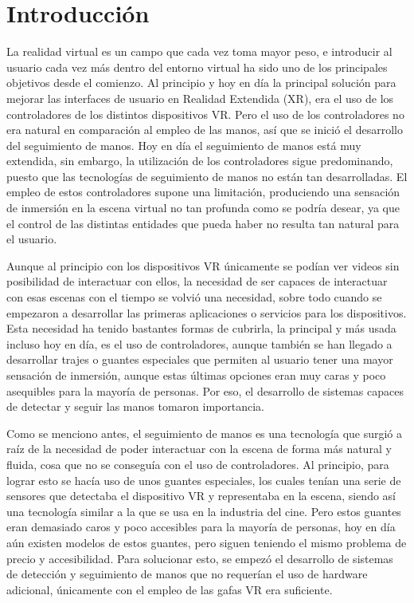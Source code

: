 \documentclass[a4paper, 12pt]{book}
\begin{document}
\chapter{Introducción}
\label{sec:intro} %
La realidad virtual es un campo que cada vez toma mayor peso, e introducir al usuario cada vez más dentro del entorno virtual ha sido uno de los principales objetivos desde el comienzo. Al principio y hoy en día la principal 
solución para mejorar las interfaces de usuario en Realidad Extendida (XR), era el uso de los controladores de los distintos dispositivos VR. Pero el uso de los controladores no era natural en comparación al empleo de las manos, así que se inició el desarrollo del seguimiento de manos. Hoy en 
día el seguimiento de manos está muy extendida, sin embargo, la utilización de los controladores sigue predominando, puesto que las tecnologías de seguimiento de manos no están tan desarrolladas. El empleo de estos controladores supone una limitación, produciendo una sensación de inmersión en la escena virtual no tan profunda como se podría desear, ya que 
el control de las distintas entidades que pueda haber no resulta tan natural para el usuario.  

Aunque al principio con los dispositivos VR únicamente se podían ver videos sin posibilidad de interactuar con ellos, la necesidad de ser capaces de interactuar con esas escenas con el tiempo se volvió una necesidad, sobre todo cuando se empezaron a desarrollar las primeras aplicaciones o servicios para los dispositivos. 
Esta necesidad ha tenido bastantes formas de cubrirla, la principal y más usada incluso hoy en día, es el uso de controladores, aunque también se han llegado a desarrollar trajes o guantes especiales que permiten al usuario tener una mayor sensación de inmersión, aunque estas últimas opciones eran muy caras y poco asequibles para la mayoría de personas. Por eso,
el desarrollo de sistemas capaces de detectar y seguir las manos tomaron importancia.

Como se menciono antes, el seguimiento de manos es una tecnología que surgió a raíz de la necesidad de poder interactuar con la escena de forma más natural y fluida, cosa que no se conseguía con el uso de controladores. Al principio, para lograr esto se hacía uso de unos guantes especiales, los cuales tenían una serie de sensores que detectaba el dispositivo VR y representaba en la escena, siendo así una tecnología similar a la que se usa en la industria del cine.
Pero estos guantes eran demasiado caros y poco accesibles para la mayoría de personas, hoy en día aún existen modelos de estos guantes, pero siguen teniendo el mismo problema de precio y accesibilidad. Para solucionar esto, se empezó el desarrollo de sistemas de detección y seguimiento de manos que no requerían el uso de hardware adicional, únicamente con el empleo de las gafas VR era suficiente. 
\end{document}
